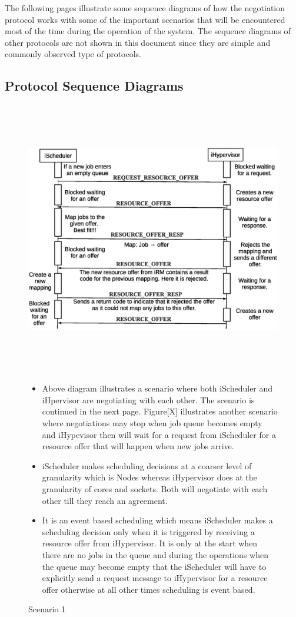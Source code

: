 \documentclass[a4paper, 12pt]{article}
\begin{document}
\noindent
The following pages illustrate some sequence diagrams of how the negotiation protocol works with some of the important scenarios that will be encountered most of the time during the operation of the system. The sequence diagrams of other protocols are not shown in this document since they are simple and commonly observed type of protocols.
\clearpage
\subsection{Protocol Sequence Diagrams}
\vspace{-0.15in}
\begin{figure}[!htbp]
\centering
\includegraphics[width=1.0\textwidth, height=120mm]{./figures.eps}
\caption{Scenario 1}
\begin{itemize}
\item Above diagram illustrates a scenario where both iScheduler and iHpervisor are negotiating with each other. The scenario is continued in the next page. Figure[X] illustrates another scenario where negotiations may stop when job queue becomes empty and iHypevisor then will wait for a request from iScheduler for a resource offer that will happen when new jobs arrive.
\item iScheduler makes scheduling decisions at a coarser level of granularity which is Nodes whereas iHypervisor does at the granularity of cores and sockets. Both will negotiate with each other till they reach an agreement.
\item It is an event based scheduling which means iScheduler makes a scheduling decision only when it is triggered by receiving a resource offer from iHypervisor. It is only at the start when there are no jobs in the queue and during the operations when the queue may become empty that the iScheduler will have to explicitly send a request message to iHypervisor for a resource offer otherwise at all other times scheduling is event based.
\end{itemize}
\label{fig:Seq1}
\end{figure}
\end{document}
